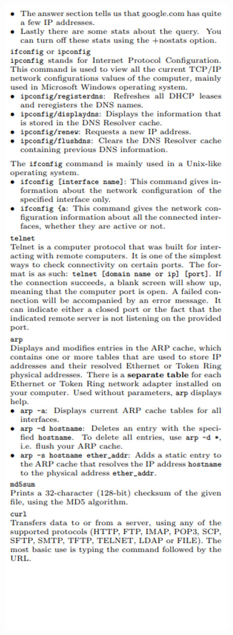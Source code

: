 \documentclass[12pt, landscape]{article}
\begin{document}
\begin{multicols*}{3}
\centerline{\includegraphics[width=0.90\linewidth]{command2}}



















  
  
  
\end{multicols*}
\end{document}
